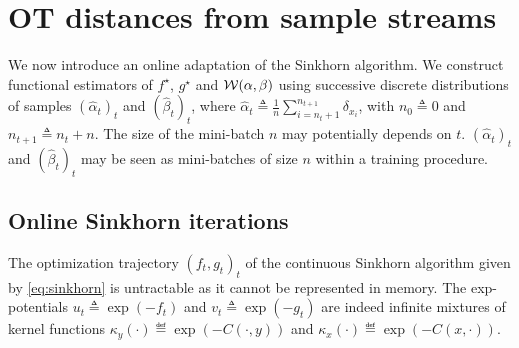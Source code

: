 
\section{OT distances from sample streams}

We now introduce an online adaptation of the Sinkhorn algorithm. We construct functional estimators of $f^\star$, $g^\star$
and $\mathcal{W}(\alpha,\beta)$ using successive discrete distributions of samples ${(\hat \alpha_t)}_t$
and ${(\hat \beta_t)}_t$, where $\hat\alpha_t \triangleq \frac{1}{n} \sum_{i=n_t +
1}^{n_{t+1}} \delta_{x_i}$, with  $n_0 \triangleq 0$ and $n_{t+1} \triangleq n_{t} +
n$. The size of the mini-batch $n$ may potentially depends on $t$.
${(\hat \alpha_t)}_t$ and ${(\hat \beta_t)}_t$ may be
seen as mini-batches of size $n$ within a training procedure.
%
% 


\subsection{Online Sinkhorn iterations}
\label{sec-online-sink-iter}

The optimization trajectory ${(f_t, g_t)}_t$ of the continuous Sinkhorn
algorithm given by \eqref{eq:sinkhorn} is untractable as it cannot be
represented in memory. The exp-potentials $u_t \triangleq \exp(- f_t)$ and $v_t
\triangleq \exp(-g_t)$ are indeed infinite mixtures of kernel functions
$\kappa_y(\cdot) \eqdef \exp(-C(\cdot, y))$ and $\kappa_x(\cdot) \eqdef \exp(-C(x, \cdot))$. 


